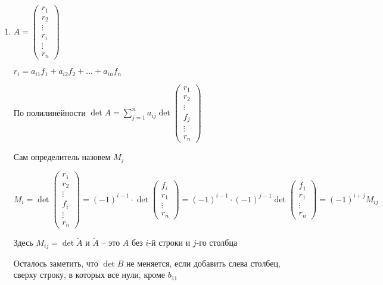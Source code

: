 \documentclass[12pt]{article}
\begin{document}
\begin{enumerate}
    \item $A = \begin{pmatrix}
        r_1 \\
        r_2 \\
        \vdots \\
        r_i \\
        \vdots \\
        r_n
    \end{pmatrix}$

    $r_i = a_{i1}f_1 + a_{i2}f_2 + \ldots + a_{in}f_n$

    По полилинейности $\det A = \sum\limits_{j = 1}^n a_{ij} \det \begin{pmatrix}
        r_1 \\ 
        r_2 \\
        \vdots \\
        f_j \\
        \vdots \\
        r_n
    \end{pmatrix}$

    Сам определитель назовем $M_j$

    $M_i = \det \begin{pmatrix}
        r_1 \\
        r_2 \\
        \vdots \\
        f_i \\
        \vdots \\
        r_n
    \end{pmatrix} = (-1)^{i - 1} \cdot \det \begin{pmatrix}
        f_i \\
        r_1 \\
        \vdots \\ 
        r_n 
    \end{pmatrix} = (-1)^{i - 1} \cdot (-1)^{j - 1} \det \begin{pmatrix}
        f_1 \\
        r_1 \\
        \vdots \\
        r_n
    \end{pmatrix} = (-1)^{i + j} M_{ij}$

    Здесь $M_{ij} = \det \tilde{A}$ и $\tilde{A}$ -- это $A$ без $i$-й строки и $j$-го столбца

    Осталось заметить, что $\det B$ не меняется, если добавить слева столбец, сверху строку, в которых все нули, кроме $b_{11}$
\end{enumerate}
\end{document}
